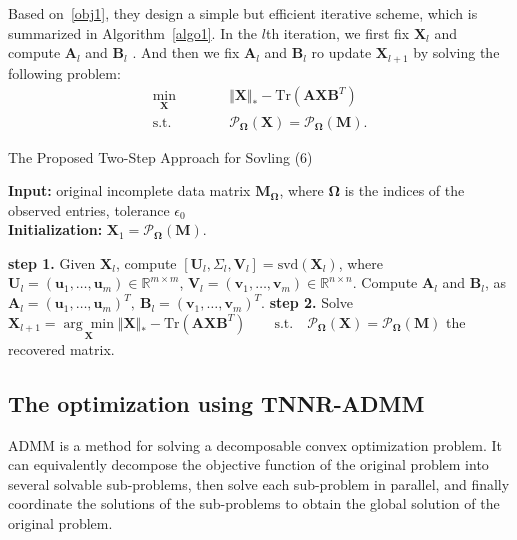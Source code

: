 \documentclass{article}
\begin{document}
{Based on~\eqref{obj1},  they design a simple but efficient iterative scheme, which is summarized in Algorithm~\ref{algo1}. In the $l$th iteration, we first fix $\mathbf X_l$ and compute $\mathbf A_l$ and $\mathbf B_l$ . And then we fix $\mathbf A_l$ and $\mathbf B_l$ ro update $\mathbf X_{l+1}$ by  solving the following problem:
\begin{equation}
\begin{aligned}
    \underset{\mathbf X}{\min}\qquad&\quad \Vert\mathbf X \Vert_* - \text{Tr}(\mathbf A\mathbf X\mathbf B^T) \\
    \text{s.t.}\qquad&\quad   \mathcal{P}_{\mathbf\Omega}(\mathbf X) =  \mathcal{P}_{\mathbf\Omega}(\mathbf M).
\end{aligned}\label{obj2}
\end{equation}

\begin{algorithm}[t]
    \caption{The Proposed Two-Step Approach for Sovling (6)}
    \label{algo1}
    \textbf{Input:} original incomplete data matrix $\mathbf M_{\mathbf\Omega}$, where $\mathbf \Omega$ is the indices of the observed entries, tolerance $\epsilon_0$ \\
    \textbf{Initialization:} $\mathbf X_1 = \mathcal{P}_{\mathbf\Omega}(\mathbf M)$. 
    \begin{algorithmic}
        \Repeat 
        \State \textbf{step 1.} Given $\mathbf X_l$, compute $[\mathbf U_l, \mathbf \varSigma_l, \mathbf V_l] = \text{svd}(\mathbf X_l)$, 
        \State where $\mathbf U_l = (\bm u_1,\dots,\bm u_m) \in \mathbb{R}^{m \times m}$, $\mathbf V_l = (\bm v_1,\dots,\bm v_m) \in \mathbb{R}^{n \times n}$. 
        \State Compute $\mathbf A_l$ and $\mathbf B_l$, as $\mathbf A_l = (\bm u_1,\dots,\bm u_m)^T, \ \mathbf B_l = (\bm v_1,\dots,\bm v_m)^T$.
        \State \textbf{step 2.} Solve $\mathbf X_{l+1} = \underset{\mathbf X}{\arg\min} \Vert\mathbf X \Vert_* - \text{Tr}(\mathbf A\mathbf X\mathbf B^T) \qquad \text{s.t.} \quad \mathcal{P}_{\mathbf\Omega}(\mathbf X) =  \mathcal{P}_{\mathbf\Omega}(\mathbf M)$ 
        \State \Return the recovered matrix.
    \end{algorithmic}
\end{algorithm}



\subsection{The optimization using TNNR-ADMM}
ADMM is a method for solving a decomposable convex optimization problem. It can equivalently decompose the objective function of the original problem into several solvable sub-problems, then solve each sub-problem in parallel, and finally coordinate the solutions of the sub-problems to obtain the global solution of the original problem.

}
\end{document}
